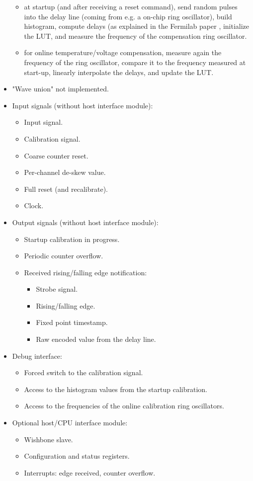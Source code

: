 \documentclass[a4paper,11pt]{article}
\begin{document}
\begin{itemize}
\begin{itemize}
\item at startup (and after receiving a reset command), send random pulses into the delay line (coming from e.g. a on-chip ring oscillator), build histogram, compute delays (as explained in the Fermilab paper \cite{fermilab}, initialize the LUT, and measure the frequency of the compensation ring oscillator.
\item for online temperature/voltage compensation, measure again the frequency of the ring oscillator, compare it to the frequency measured at start-up, linearly interpolate the delays, and update the LUT.
\end{itemize}
\item "Wave union" not implemented.
\item Input signals (without host interface module):
\begin{itemize}
\item Input signal.
\item Calibration signal.
\item Coarse counter reset.
\item Per-channel de-skew value.
\item Full reset (and recalibrate).
\item Clock.
\end{itemize}
\item Output signals (without host interface module):
\begin{itemize}
\item Startup calibration in progress.
\item Periodic counter overflow.
\item Received rising/falling edge notification:
\begin{itemize}
\item Strobe signal.
\item Rising/falling edge.
\item Fixed point timestamp.
\item Raw encoded value from the delay line.
\end{itemize}
\end{itemize}
\item Debug interface:
\begin{itemize}
\item Forced switch to the calibration signal.
\item Access to the histogram values from the startup calibration.
\item Access to the frequencies of the online calibration ring oscillators.
\end{itemize}
\item Optional host/CPU interface module:
\begin{itemize}
\item Wishbone slave.
\item Configuration and status registers.
\item Interrupts: edge received, counter overflow.
\end{itemize}
\end{itemize}
\end{document}

